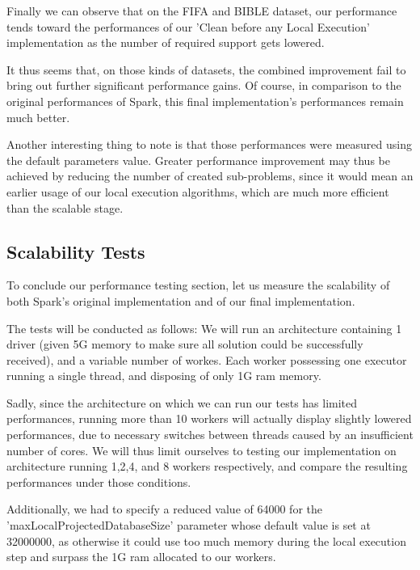 \documentclass{eplmastersthesis}
\begin{document}
Finally we can observe that on the FIFA and BIBLE dataset, our performance tends toward the performances of our 'Clean before any Local Execution' implementation as the number of required support gets lowered. \newline

It thus seems that, on those kinds of datasets, the combined improvement fail to bring out further significant performance gains.
Of course, in comparison to the original performances of Spark, this final implementation's performances remain much better. \newline

Another interesting thing to note is that those performances were measured using the default parameters value. Greater performance improvement may thus be achieved by reducing the number of created sub-problems, since it would mean an earlier usage of our local execution algorithms, which are much more efficient than the scalable stage. \newline

\subsection{Scalability Tests}

To conclude our performance testing section, let us measure the scalability of both Spark's original implementation and of our final implementation. \newline

The tests will be conducted as follows: We will run an architecture containing 1 driver (given 5G memory to make sure all solution could be successfully received), and a variable number of workes. Each worker possessing one executor running a single thread, and disposing of only 1G ram memory. \newline

Sadly, since the architecture on which we can run our tests has limited performances, running more than 10 workers will actually display slightly lowered performances, due to necessary switches between threads caused by an insufficient number of cores. We will thus limit ourselves to testing our implementation on architecture running 1,2,4, and 8 workers respectively, and compare the resulting performances under those conditions. \newline

Additionally, we had to specify a reduced value of 64000 for the 'maxLocalProjectedDatabaseSize' parameter whose default value is set at 32000000, as otherwise it could use too much memory during the local execution step and surpass the 1G ram allocated to our workers.
\end{document}
